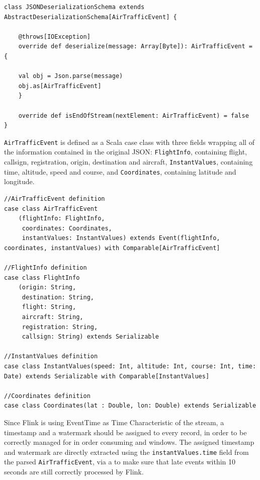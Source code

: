 \begin{code}
   \begin{verbatim}
class JSONDeserializationSchema extends AbstractDeserializationSchema[AirTrafficEvent] {
       
    @throws[IOException]
    override def deserialize(message: Array[Byte]): AirTrafficEvent = {
       
    val obj = Json.parse(message)
    obj.as[AirTrafficEvent]
    }
       
    override def isEndOfStream(nextElement: AirTrafficEvent) = false
}
   \end{verbatim}
\end{code}

\texttt{AirTrafficEvent} is defined as a Scala case class with three fields wrapping all of the information contained in the original JSON: \texttt{FlightInfo}, containing flight, callsign, registration, origin, destination and aircraft, \texttt{InstantValues}, containing time, altitude, speed and course, and \texttt{Coordinates}, containing latitude and longitude.

\begin{code}
    \begin{verbatim}
//AirTrafficEvent definition
case class AirTrafficEvent
    (flightInfo: FlightInfo,
     coordinates: Coordinates,
     instantValues: InstantValues) extends Event(flightInfo, coordinates, instantValues) with Comparable[AirTrafficEvent]

//FlightInfo definition
case class FlightInfo
    (origin: String,
     destination: String,
     flight: String,
     aircraft: String,
     registration: String,
     callsign: String) extends Serializable

//InstantValues definition
case class InstantValues(speed: Int, altitude: Int, course: Int, time: Date) extends Serializable with Comparable[InstantValues]

//Coordinates definition
case class Coordinates(lat : Double, lon: Double) extends Serializable
    \end{verbatim}
\end{code}

Since Flink is using EventTime as Time Characteristic of the stream, a timestamp and a watermark should be assigned to every record, in order to be correctly managed for in order consuming and windows. The assigned timestamp and watermark are directly extracted using the \texttt{instantValues.time} field from the parsed \texttt{AirTrafficEvent}, via a  to make sure that late events within 10 seconds are still correctly processed by Flink.


